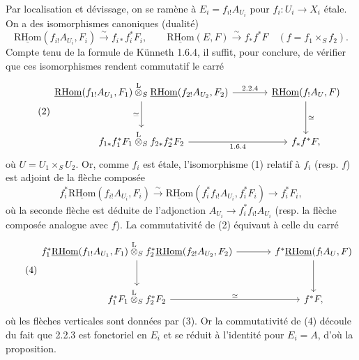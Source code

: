 \documentclass[11pt]{article}
\newcommand{\R}{\mathrm{R}}\newcommand{\RHomCore}{\mathrm{RHom}}
\providecommand{\RHom}{\RHomCore}
\providecommand{\uRHom}{\underline{\RHom}}
\providecommand{\RHom}{\RHomCore}
\providecommand{\RHom}{\R\mathcal{H}om}
\providecommand{\R}{\mathrm R}
\providecommand{\RHom}{\RHomCore}
\begin{document}
Par localisation et dévissage, on se ramène à $E_i=f_{i!}A_{U_i}$ pour $f_i:U_i\to X_i$ étale. On a des isomorphismes canoniques (dualité)
\begin{equation}\tag{1}
\uRHom(f_{i!}A_{U_i},F_i)\xrightarrow{\sim}f_{i*}f_i^{*}F_i,
\qquad
\uRHom(E,F)\xrightarrow{\sim}f_{*}f^{*}F\quad(f=f_1\times_S f_2).
\end{equation}
Compte tenu de la formule de Künneth 1.6.4, il suffit, pour conclure, de vérifier que ces isomorphismes rendent commutatif le carré
\begin{equation}\tag{2}
\begin{tikzcd}[column sep=large,row sep=large]
\uRHom(f_{1!}A_{U_1},F_1)\overset{\mathrm{L}}{\otimes}_{S}\uRHom(f_{2!}A_{U_2},F_2) \arrow[r,"2.2.4"] \arrow[d,"\simeq"'] & \uRHom(f_{!}A_U,F) \arrow[d,"\simeq"]\\
f_{1*}f_1^{*}F_1\overset{\mathrm{L}}{\otimes}_{S}f_{2*}f_2^{*}F_2 \arrow[r,"1.6.4"'] & f_{*}f^{*}F,
\end{tikzcd}
\end{equation}
où $U=U_1\times_S U_2$. Or, comme $f_i$ est étale, l'isomorphisme (1) relatif à $f_i$ (resp. $f$) est adjoint de la flèche composée
\begin{equation}\tag{3}
f_i^{*}\uRHom(f_{i!}A_{U_i},F_i)\xrightarrow{\sim}\uRHom(f_i^{*}f_{i!}A_{U_i},f_i^{*}F_i)\longrightarrow f_i^{*}F_i,
\end{equation}
où la seconde flèche est déduite de l'adjonction $A_{U_i}\to f_i^{*}f_{i!}A_{U_i}$ (resp. la flèche composée analogue avec $f$). La commutativité de (2) équivaut à celle du carré
\begin{equation}\tag{4}
\begin{tikzcd}[column sep=large,row sep=large]
f_1^{*}\uRHom(f_{1!}A_{U_1},F_1)\overset{\mathrm{L}}{\otimes}_{S}f_2^{*}\uRHom(f_{2!}A_{U_2},F_2) \arrow[r] \arrow[d] & f^{*}\uRHom(f_{!}A_U,F) \arrow[d]\\
f_1^{*}F_1\overset{\mathrm{L}}{\otimes}_{S}f_2^{*}F_2 \arrow[r,"\simeq"] & f^{*}F,
\end{tikzcd}
\end{equation}
où les flèches verticales sont données par (3). Or la commutativité de (4) découle du fait que 2.2.3 est fonctoriel en $E_i$ et se réduit à l'identité pour $E_i=A$, d'où la proposition.
\end{document}
